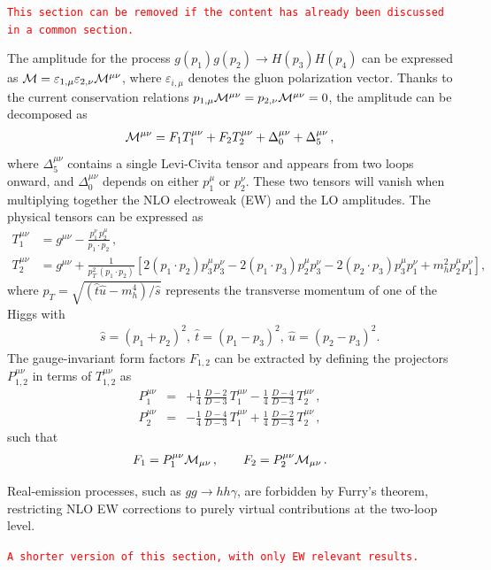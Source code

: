 

\begin{center}
    \textcolor{red}{\texttt{This section can be removed if the content has already been discussed in a common section.}}
\end{center}

The amplitude for the process $g(p_1)g(p_2) \to H(p_3)H(p_4)$ can be expressed as ${\cal M}=\varepsilon_{1,\mu}\varepsilon_{2,\nu}{\cal M}^{\mu\nu}$, where $\varepsilon_{i,\mu}$ denotes the gluon polarization vector. Thanks to the current conservation relations $p_{1,\mu}{\cal M}^{\mu\nu}=p_{2,\nu}{\cal M}^{\mu\nu}=0$, the amplitude can be decomposed as
\begin{align}
{\cal M}^{\mu\nu}=F_1T_1 ^{\mu\nu}+F_2T_2 ^{\mu\nu}+\Delta_0^{\mu\nu}+\Delta_5^{\mu\nu}
\,,
\end{align}
where $\Delta_5^{\mu\nu}$ contains a single Levi-Civita tensor and appears from two loops onward, and $\Delta_0^{\mu\nu}$ depends on either $p_1^{\mu}$ or $p_2^{\nu}$. These two tensors will vanish when multiplying together the NLO electroweak (EW) and the LO amplitudes. The physical tensors can be expressed as \cite{Glover:1987nx,Plehn:1996wb}
\begin{align}
T_1 ^{\mu\nu} &= g^{\mu\nu}-\frac{p_1^{\nu}\,p_2^{\mu}}{p_1\cdot  p_2}
\,,\label{eq:Ttensors} \\
T_2 ^{\mu\nu} &= g^{\mu\nu}+\frac{1}{p_{T}^{2}\,(p_1\cdot p_2)}\left[ 2(p_1\cdot p_2)p_3^{\mu}p_3^{\nu} - 2(p_1\cdot p_3)p_2^{\mu}p_3^{\nu}
-2(p_2\cdot p_3)p_3^{\mu}p_1^{\nu}+ m_h^2 p_2^{\mu}p_1^{\nu} \right]
, \label{eq:Ttensors2}
\end{align}
where $p_{T}=\sqrt{(\hat{t}\hat{u} - m_h^4)/\hat{s}}$ represents the transverse momentum of one of the Higgs with 
\begin{eqnarray}
&&\hat{s}=(p_1+p_2)^2,~\hat{t}=(p_1-p_3)^2,~\hat{u}=(p_2-p_3)^2.\label{st}
\end{eqnarray} 
The gauge-invariant form factors $F_{1,2}$ can be extracted by defining the projectors $P_{1,2}^{\mu\nu}$ in terms of $T_{1,2}^{\mu\nu}$ as
\begin{eqnarray}
P_1^{\mu\nu} &=&+\frac{1}{4}\,\frac{D-2}{D-3} \,T_1^{\mu\nu}
-\frac{1}{4}\,\frac{D-4}{D-3} \,T_2^{\mu\nu}
\,,\label{eq:proj1}\\
P_2^{\mu\nu}&=& -\frac{1}{4}\,\frac{D-4}{D-3} \,T_1^{\mu\nu}
+\frac{1}{4}\,\frac{D-2}{D-3} \,T_2^{\mu\nu}
\,,\label{eq:proj2}
\end{eqnarray}   
such that 
\begin{eqnarray}
F_1=P_1^{\mu\nu} {\cal M}_{\mu\nu}\,,\qquad F_2=P_2^{\mu\nu} {\cal M}_{\mu\nu}\,.
\end{eqnarray}

Real-emission processes, such as $gg \to hh\gamma$, are forbidden by Furry's theorem, restricting NLO EW corrections to purely virtual contributions at the two-loop level.




\begin{center}
    \textcolor{red}{\texttt{A shorter version of this section, with only EW relevant results.}}
\end{center}